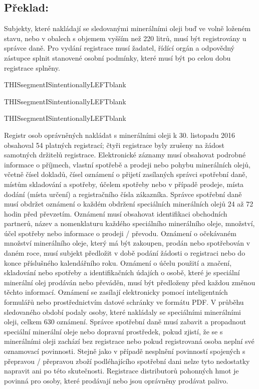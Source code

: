 \documentclass[10pt]{article}
\begin{document}
\pagebreak

\subsection*{Překlad:}

Subjekty, které nakládají se sledovanými minerálními oleji buď ve volně loženém stavu, nebo v obalech s objemem vyšším než 220 litrů, musí být registrovány u správce daně.
Pro vydání registrace musí žadatel, řídící orgán a odpovědný zástupce splnit stanovené osobní podmínky, které musí být po celou dobu registrace splněny.


THISsegmentISintentionallyLEFTblank



THISsegmentISintentionallyLEFTblank



THISsegmentISintentionallyLEFTblank

Registr osob oprávněných nakládat s minerálními oleji k 30. listopadu 2016 obsahoval 54 platných registrací; čtyři registrace byly zrušeny na žádost samotných držitelů registrace.
Elektronické záznamy musí obsahovat podrobné informace o příjmech, vlastní spotřebě a prodeji nebo pohybu minerálních olejů, včetně čísel dokladů, čísel oznámení o přijetí zasílaných správci spotřební daně, místům skladování a spotřeby, účelem spotřeby nebo v případě prodeje, místa dodání (místa určení) a registračního čísla zákazníka.
Správce spotřební daně musí obdržet oznámení o každém obdržení speciálních minerálních olejů 24 až 72 hodin před převzetím.
Oznámení musí obsahovat identifikaci obchodních partnerů, název a nomenklaturu každého speciálního minerálního oleje, množství, účel spotřeby nebo informace o prodeji / převodu.
Oznámení o očekávaném množství minerálního oleje, který má být zakoupen, prodán nebo spotřebován v daném roce, musí subjekt předložit v době podání žádosti o registraci nebo do konce příslušného kalendářního roku.
Oznámení o účelu použití a značení, skladování nebo spotřeby a identifikačních údajích o osobě, které je speciální minerální olej prodáván nebo převáděn, musí být předloženy před každou změnou těchto informací.
Oznámení se zasílají elektronicky pomocí inteligentních formulářů nebo prostřednictvím datové schránky ve formátu PDF.
V průběhu sledovaného období podaly osoby, které nakládaly se speciálními minerálními oleji, celkem 630 oznámení.
Správce spotřební daně musí zabavit a propadnout speciální minerální oleje nebo dopravní prostředek, pokud zjistí, že se s minerálními oleji zachází bez registrace nebo pokud registrovaná osoba neplní své oznamovací povinnosti.
Stejně jako v případě nesplnění povinností spojených s přepravou / přepravou zboží podléhajícího spotřební dani nelze tyto nedostatky napravit ani po této skutečnosti.
Registrace distributorů pohonných hmot je povinná pro osoby, které prodávají nebo jsou oprávněny prodávat palivo.
\end{document}
